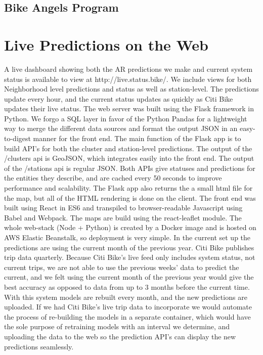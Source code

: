\documentclass{proc}
\begin{document}
\subsection{Bike Angels Program}


\section{Live Predictions on the Web}
A live dashboard showing both the AR predictions we make and current system status is available to view at http://live.status.bike/. We include views for both Neighborhood level predictions and status as well as station-level. The predictions update every hour, and the current status updates as quickly as Citi Bike updates their live status. The web server was built using the Flask framework in Python. We forgo a SQL layer in favor of the Python Pandas for a lightweight way to merge the different data sources and format the output JSON in an easy-to-digest manner for the front end. The main function of the Flask app is to build API's for both the cluster and station-level predictions. The output of the /clusters api is GeoJSON, which integrates easily into the front end. The output of the /stations api is regular JSON. Both APIs give statuses and predictions for the entities they describe, and are cached every 50 seconds to improve performance and scalability. The Flask app also returns the a small html file for the map, but all of the HTML rendering is done on the client. The front end was built using React in ES6 and transpiled to browser-readable Javascript using Babel and Webpack. The maps are build using the react-leaflet module. The whole web-stack (Node + Python) is created by a Docker image and is hosted on AWS Elastic Beanstalk, so deployment is very simple. In the current set up the predictions are using the current month of the previous year. Citi Bike publishes trip data quarterly. Because Citi Bike's live feed only includes system status, not current trips, we are not able to use the previous weeks' data to predict the current, and we felt using the current month of the previous year would give the best accuracy as opposed to data from up to 3 months before the current time. With this system models are rebuilt every month, and the new predictions are uploaded. If we had Citi Bike's live trip data to incorporate we would automate the process of re-building the models in a separate container, which would have the sole purpose of retraining models with an interval we determine, and uploading the data to the web so the prediction API's can display the new predictions seamlessly.
\end{document}
